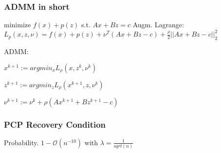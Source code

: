 \documentclass[11pt,twocolumn]{article}
\begin{document}
\subsubsection{ADMM in short}

minimize $f(x) + p(z)$ s.t. $Ax+Bz=c$
Augm. Lagrange: $L_p(x,z, \nu)= f(x) +p(z)+\nu^T (Ax+Bz-c) + \frac{\rho}{2}  ||Ax+Bz-c||_2^2$

ADMM:

$x^{k+1} := argmin_x L_{\rho} (x, z^k, \nu^k)$

$z^{k+1} := argmin_z L_{\rho} (x^{k+1}, z, \nu^k)$

$\nu^{k+1} := \nu^k + \rho  (Ax^{k+1} + Bz^{k+1} -c)$

\subsubsection{PCP Recovery Condition}

Probability. $ 1 - \mathcal{O}(n^{-10})$ with $\lambda = \frac{1}{sqrt(n)}$
\end{document}
